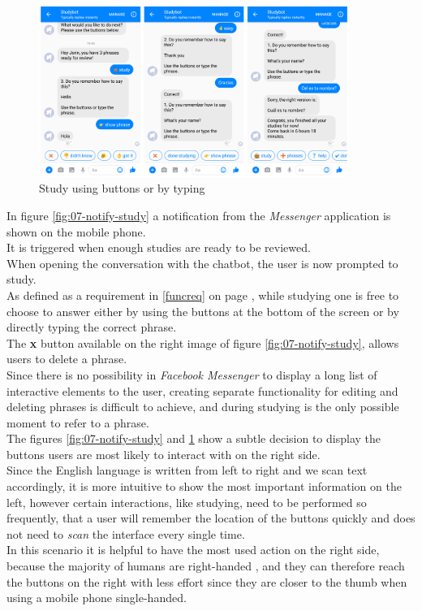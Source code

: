 \begin{figure}[h]
  \centering
  \includegraphics[width=0.9\textwidth]{images/interface/08-study-done.png}
	\caption{Study using buttons or by typing}
	\label{fig:08-study-done}
\end{figure}

In figure \ref{fig:07-notify-study} a notification from the \emph{Messenger} application is shown on the mobile phone.
\\
It is triggered when enough studies are ready to be reviewed.
\\
When opening the conversation with the chatbot,
the user is now prompted to study.
\\
As defined as a requirement in \ref{funcreq} on page \pageref{funcreq},
while studying one is free to choose to answer either by using the buttons at the bottom of the screen
or by directly typing the correct phrase.
\\

The \textbf{x} button available on the right image of figure \ref{fig:07-notify-study},
allows users to delete a phrase.
\\
Since there is no possibility in \emph{Facebook Messenger} to display a long list of interactive elements to the user,
creating separate functionality for editing and deleting phrases is difficult to achieve,
and during studying is the only possible moment to refer to a phrase.
\\

The figures \ref{fig:07-notify-study} and \ref{fig:08-study-done} show a subtle decision to display the buttons users are most likely to interact with
on the right side.
\\
Since the English language is written from left to right and we scan text accordingly,
it is more intuitive to show the most important information on the left,
however certain interactions, like studying, need to be performed so frequently,
that a user will remember the location of the buttons quickly and does not need to \emph{scan} the interface every single time.
\\
In this scenario it is helpful to have the most used action on the right side, because the majority of humans are right-handed \cite{righthand},
and they can therefore reach the buttons on the right with less effort since they are closer to the thumb when using a mobile phone single-handed.
\\

